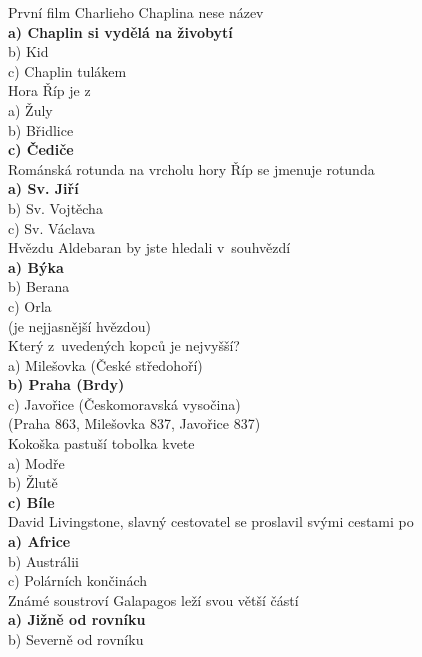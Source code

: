 \begin{multicols}{\value{columnsthindata}}
\noindent
První film Charlieho Chaplina nese název\\
\textbf{a) Chaplin si vydělá na živobytí}\\
b) Kid\\
c) Chaplin tulákem\\

\noindent
Hora Říp je z \\
a) Žuly\\
b) Břidlice\\
\textbf{c) Čediče}\\

\noindent
Románská rotunda na vrcholu hory Říp se jmenuje rotunda\\
\textbf{a) Sv. Jiří}\\
b) Sv. Vojtěcha\\
c) Sv. Václava\\

\noindent
Hvězdu Aldebaran by jste hledali v~souhvězdí\\
\textbf{a) Býka}\\
b) Berana\\
c) Orla\\
(je nejjasnější hvězdou)\\

\noindent
Který z~uvedených kopců je nejvyšší?\\
a) Milešovka (České středohoří)\\
\textbf{b) Praha (Brdy)}\\
c) Javořice (Českomoravská vysočina)\\
(Praha 863, Milešovka 837, Javořice 837)\\

\noindent
Kokoška pastuší tobolka kvete\\
a) Modře\\
b) Žlutě\\
\textbf{c) Bíle}\\

\noindent
David Livingstone, slavný cestovatel se proslavil svými cestami 
po\\
\textbf{a) Africe}\\
b) Austrálii\\
c) Polárních končinách\\

\noindent
Známé soustroví Galapagos leží svou větší částí\\
\textbf{a) Jižně od rovníku}\\
b) Severně od rovníku\\


\end{multicols}
